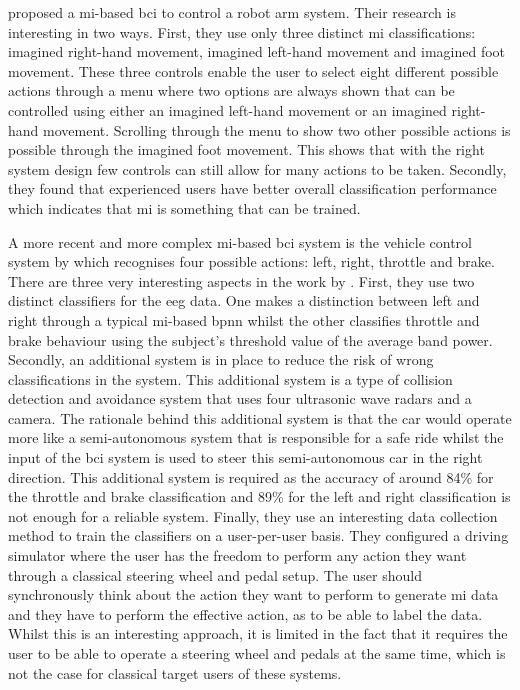 






 proposed a \gls{mi}-based \gls{bci} to control a robot arm system.
Their research is interesting in two ways.
First, they use only three distinct \gls{mi} classifications: imagined right-hand movement, imagined left-hand movement and imagined foot movement.
These three controls enable the user to select eight different possible actions through a menu where two options are always shown that can be controlled using either an imagined left-hand movement or an imagined right-hand movement.
Scrolling through the menu to show two other possible actions is possible through the imagined foot movement.
This shows that with the right system design few controls can still allow for many actions to be taken.
Secondly, they found that experienced users have better overall classification performance which indicates that \gls{mi} is something that can be trained.

A more recent and more complex \gls{mi}-based \gls{bci} system is the vehicle control system by \citet{bci_mi_four_wheel_drive} which recognises four possible actions: left, right, throttle and brake.
There are three very interesting aspects in the work by \citet{bci_mi_four_wheel_drive}.
First, they use two distinct classifiers for the \gls{eeg} data.
One makes a distinction between left and right through a typical \gls{mi}-based \gls{bpnn} whilst the other classifies throttle and brake behaviour using the subject’s threshold value of the average band power.
Secondly, an additional system is in place to reduce the risk of wrong classifications in the system.
This additional system is a type of collision detection and avoidance system that uses four ultrasonic wave radars and a camera.
The rationale behind this additional system is that the car would operate more like a semi-autonomous system that is responsible for a safe ride whilst the input of the \gls{bci} system is used to steer this semi-autonomous car in the right direction.
This additional system is required as the accuracy of around 84\% for the throttle and brake classification and 89\% for the left and right classification is not enough for a reliable system.
Finally, they use an interesting data collection method to train the classifiers on a user-per-user basis.
They configured a driving simulator where the user has the freedom to perform any action they want through a classical steering wheel and pedal setup.
The user should synchronously think about the action they want to perform to generate \gls{mi} data and they have to perform the effective action, as to be able to label the data.
Whilst this is an interesting approach, it is limited in the fact that it requires the user to be able to operate a steering wheel and pedals at the same time, which is not the case for classical target users of these systems.











